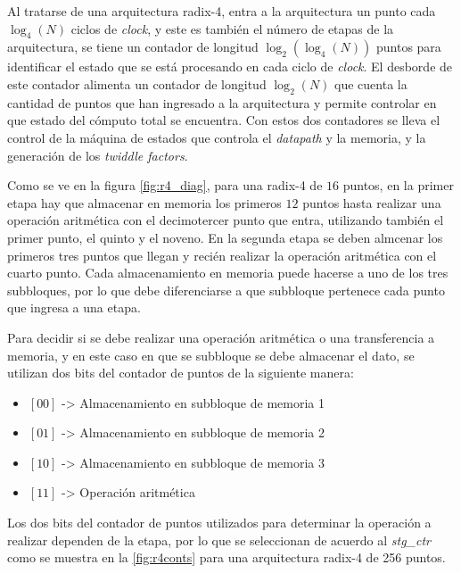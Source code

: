 Al tratarse de una arquitectura radix-4, entra a la arquitectura un punto cada $\log_4(N)$ ciclos de
\textit{clock}, y este es también el número de etapas de la arquitectura, se tiene  un contador de
longitud $\log_2(\log_4(N))$ puntos para identificar el estado que se está procesando en cada ciclo
de \textit{clock}. El desborde de este contador alimenta un contador de longitud $\log_2(N)$ que
cuenta la cantidad de puntos que han ingresado a la arquitectura y permite controlar en que estado
del cómputo total se encuentra. Con estos dos contadores se lleva el control de la máquina de
estados que controla el \textit{datapath} y la memoria, y la generación de los \textit{twiddle
factors}.

Como se ve en la figura \ref{fig:r4_diag}, para una radix-4 de $16$ puntos, en la primer etapa hay
que almacenar en memoria los primeros $12$ puntos hasta realizar una operación aritmética con el
decimotercer punto que entra, utilizando también el primer punto, el quinto y el noveno. En la
segunda etapa se deben almcenar los primeros tres puntos que llegan y recién realizar la operación 
aritmética con el cuarto punto. Cada almacenamiento en memoria puede hacerse a uno de los tres
subbloques, por lo que debe diferenciarse a que subbloque pertenece cada punto que ingresa a una
etapa.

Para decidir si se debe realizar una operación aritmética o una transferencia a memoria, y en este
caso en que se subbloque se debe almacenar el dato, se utilizan dos bits del contador de puntos de
la siguiente manera:

\begin{itemize}
  \item $[00]$ ->  Almacenamiento en subbloque de memoria 1
  \item $[01]$ ->  Almacenamiento en subbloque de memoria 2
  \item $[10]$ ->  Almacenamiento en subbloque de memoria 3
  \item $[11]$ ->  Operación aritmética 
\end{itemize}

Los dos bits del contador de puntos utilizados para determinar la operación a realizar dependen de
la etapa, por lo que se seleccionan de acuerdo al \textit{stg\_ctr} como se muestra en la
\ref{fig:r4conts} para una arquitectura radix-4 de 256 puntos.
 

